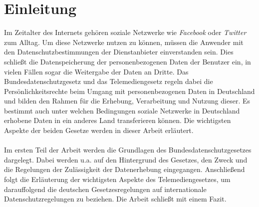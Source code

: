 \chapter{Einleitung}
Im Zeitalter des Internets gehören soziale Netzwerke wie \textit{Facebook} oder \textit{Twitter} zum Alltag. Um diese Netzwerke nutzen zu können, müssen die Anwender mit den Datenschutzbestimmungen der Dienstanbieter einverstanden sein. Dies schließt die Datenspeicherung der personenbezogenen Daten der Benutzer ein, in vielen Fällen sogar die Weitergabe der Daten an Dritte. Das Bundesdatenschutzgesetz und das Telemediengesetz regeln dabei die Persönlichkeitsrechte beim Umgang mit personenbezogenen Daten in Deutschland und bilden den Rahmen für die Erhebung, Verarbeitung und Nutzung dieser. Es bestimmt auch unter welchen Bedingungen soziale Netzwerke in Deutschland erhobene Daten in ein anderes Land transferieren können. Die wichtigsten Aspekte der beiden Gesetze werden in dieser Arbeit erläutert.\\
\\Im ersten Teil der Arbeit werden die Grundlagen des Bundesdatenschutzgesetzes dargelegt. Dabei werden u.a. auf den Hintergrund des Gesetzes, den Zweck und die Regelungen der Zulässigkeit der Datenerhebung eingegangen. Anschließend folgt die Erläuterung der wichtigsten Aspekte des Telemediengesetzes, um darauffolgend die deutschen Gesetzesregelungen auf internationale Datenschutzregelungen zu beziehen. Die Arbeit schließt mit einem Fazit.